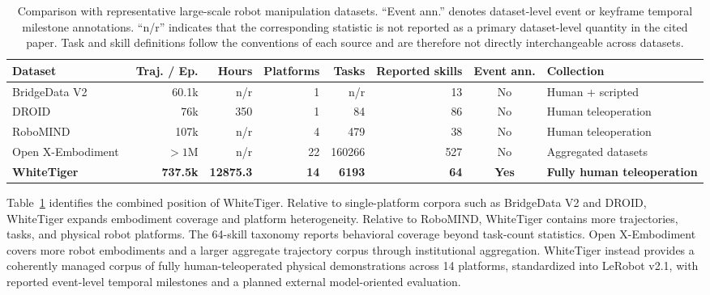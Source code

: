 \begin{table}[t]
\centering
\caption{Comparison with representative large-scale robot manipulation datasets. ``Event ann.'' denotes dataset-level event or keyframe temporal milestone annotations. ``n/r'' indicates that the corresponding statistic is not reported as a primary dataset-level quantity in the cited paper. Task and skill definitions follow the conventions of each source and are therefore not directly interchangeable across datasets.}
\label{tab:dataset-comparison}
\footnotesize
\setlength{\tabcolsep}{4pt}
\renewcommand{\arraystretch}{1.08}
\begin{adjustbox}{max width=\textwidth}
\begin{tabular}{lrrrrrcl}
\toprule
Dataset & Traj. / Ep. & Hours & Platforms & Tasks & Reported skills & Event ann. & Collection \\
\midrule
BridgeData V2~\cite{walke2023bridgedatav2} & 60.1k & n/r & 1 & n/r & 13 & No & Human + scripted \\
DROID~\cite{khazatsky2024droid} & 76k & 350 & 1 & 84 & 86 & No & Human teleoperation \\
RoboMIND~\cite{wu2024robomind} & 107k & n/r & 4 & 479 & 38 & No & Human teleoperation \\
Open X-Embodiment~\cite{oneill2023openx} & $>1$M & n/r & 22 & 160266 & 527 & No & Aggregated datasets \\
\textbf{WhiteTiger} & \textbf{737.5k} & \textbf{12875.3} & \textbf{14} & \textbf{6193} & \textbf{64} & \textbf{Yes} & \textbf{Fully human teleoperation} \\
\bottomrule
\end{tabular}
\end{adjustbox}
\end{table}

Table~\ref{tab:dataset-comparison} identifies the combined position of WhiteTiger. Relative to single-platform corpora such as BridgeData V2 and DROID, WhiteTiger expands embodiment coverage and platform heterogeneity. Relative to RoboMIND, WhiteTiger contains more trajectories, tasks, and physical robot platforms. The 64-skill taxonomy reports behavioral coverage beyond task-count statistics. Open X-Embodiment covers more robot embodiments and a larger aggregate trajectory corpus through institutional aggregation. WhiteTiger instead provides a coherently managed corpus of fully human-teleoperated physical demonstrations across 14 platforms, standardized into LeRobot v2.1, with reported event-level temporal milestones and a planned external model-oriented evaluation.

